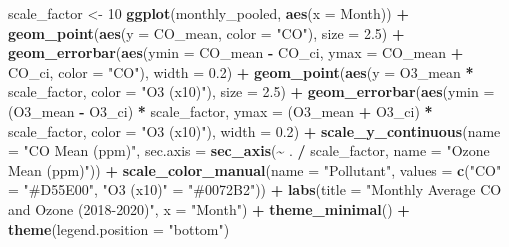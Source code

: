\documentclass[
]{article}
\newenvironment{Shaded}{\begin{snugshade}}{\end{snugshade}}
\newcommand{\AttributeTok}[1]{\textcolor[rgb]{0.13,0.29,0.53}{#1}}
\newcommand{\DecValTok}[1]{\textcolor[rgb]{0.00,0.00,0.81}{#1}}
\newcommand{\FloatTok}[1]{\textcolor[rgb]{0.00,0.00,0.81}{#1}}
\newcommand{\FunctionTok}[1]{\textcolor[rgb]{0.13,0.29,0.53}{\textbf{#1}}}
\newcommand{\NormalTok}[1]{#1}
\newcommand{\OtherTok}[1]{\textcolor[rgb]{0.56,0.35,0.01}{#1}}
\newcommand{\SpecialCharTok}[1]{\textcolor[rgb]{0.81,0.36,0.00}{\textbf{#1}}}
\newcommand{\StringTok}[1]{\textcolor[rgb]{0.31,0.60,0.02}{#1}}
\begin{document}
\begin{Shaded}
\begin{Highlighting}[]
\NormalTok{scale\_factor }\OtherTok{\textless{}{-}} \DecValTok{10}
\FunctionTok{ggplot}\NormalTok{(monthly\_pooled, }\FunctionTok{aes}\NormalTok{(}\AttributeTok{x =}\NormalTok{ Month)) }\SpecialCharTok{+}
  \FunctionTok{geom\_point}\NormalTok{(}\FunctionTok{aes}\NormalTok{(}\AttributeTok{y =}\NormalTok{ CO\_mean, }\AttributeTok{color =} \StringTok{"CO"}\NormalTok{), }\AttributeTok{size =} \FloatTok{2.5}\NormalTok{) }\SpecialCharTok{+}
  \FunctionTok{geom\_errorbar}\NormalTok{(}\FunctionTok{aes}\NormalTok{(}\AttributeTok{ymin =}\NormalTok{ CO\_mean }\SpecialCharTok{{-}}\NormalTok{ CO\_ci, }\AttributeTok{ymax =}\NormalTok{ CO\_mean }\SpecialCharTok{+}\NormalTok{ CO\_ci, }\AttributeTok{color =} \StringTok{"CO"}\NormalTok{), }\AttributeTok{width =} \FloatTok{0.2}\NormalTok{) }\SpecialCharTok{+}
  \FunctionTok{geom\_point}\NormalTok{(}\FunctionTok{aes}\NormalTok{(}\AttributeTok{y =}\NormalTok{ O3\_mean }\SpecialCharTok{*}\NormalTok{ scale\_factor, }\AttributeTok{color =} \StringTok{"O3 (x10)"}\NormalTok{), }\AttributeTok{size =} \FloatTok{2.5}\NormalTok{) }\SpecialCharTok{+}
  \FunctionTok{geom\_errorbar}\NormalTok{(}\FunctionTok{aes}\NormalTok{(}\AttributeTok{ymin =}\NormalTok{ (O3\_mean }\SpecialCharTok{{-}}\NormalTok{ O3\_ci) }\SpecialCharTok{*}\NormalTok{ scale\_factor, }\AttributeTok{ymax =}\NormalTok{ (O3\_mean }\SpecialCharTok{+}\NormalTok{ O3\_ci) }\SpecialCharTok{*}\NormalTok{ scale\_factor, }\AttributeTok{color =} \StringTok{"O3 (x10)"}\NormalTok{), }\AttributeTok{width =} \FloatTok{0.2}\NormalTok{) }\SpecialCharTok{+}
  \FunctionTok{scale\_y\_continuous}\NormalTok{(}\AttributeTok{name =} \StringTok{"CO Mean (ppm)"}\NormalTok{, }\AttributeTok{sec.axis =} \FunctionTok{sec\_axis}\NormalTok{(}\SpecialCharTok{\textasciitilde{}}\NormalTok{ . }\SpecialCharTok{/}\NormalTok{ scale\_factor, }\AttributeTok{name =} \StringTok{"Ozone Mean (ppm)"}\NormalTok{)) }\SpecialCharTok{+}
  \FunctionTok{scale\_color\_manual}\NormalTok{(}\AttributeTok{name =} \StringTok{"Pollutant"}\NormalTok{, }\AttributeTok{values =} \FunctionTok{c}\NormalTok{(}\StringTok{"CO"} \OtherTok{=} \StringTok{"\#D55E00"}\NormalTok{, }\StringTok{"O3 (x10)"} \OtherTok{=} \StringTok{"\#0072B2"}\NormalTok{)) }\SpecialCharTok{+}
  \FunctionTok{labs}\NormalTok{(}\AttributeTok{title =} \StringTok{"Monthly Average CO and Ozone (2018{-}2020)"}\NormalTok{, }\AttributeTok{x =} \StringTok{"Month"}\NormalTok{) }\SpecialCharTok{+}
  \FunctionTok{theme\_minimal}\NormalTok{() }\SpecialCharTok{+} \FunctionTok{theme}\NormalTok{(}\AttributeTok{legend.position =} \StringTok{"bottom"}\NormalTok{)}
\end{Highlighting}
\end{Shaded}
\end{document}
